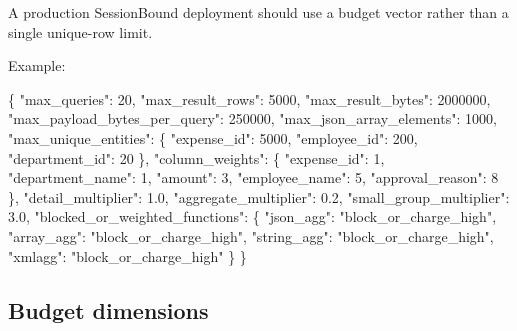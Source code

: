 \documentclass[journal]{IEEEtran}
\newenvironment{Shaded}{}{}
\newcommand{\DataTypeTok}[1]{\textcolor[rgb]{0.56,0.13,0.00}{#1}}
\newcommand{\DecValTok}[1]{\textcolor[rgb]{0.25,0.63,0.44}{#1}}
\newcommand{\FloatTok}[1]{\textcolor[rgb]{0.25,0.63,0.44}{#1}}
\newcommand{\FunctionTok}[1]{\textcolor[rgb]{0.02,0.16,0.49}{#1}}
\newcommand{\StringTok}[1]{\textcolor[rgb]{0.25,0.44,0.63}{#1}}
\begin{document}
A production SessionBound deployment should use a budget vector rather
than a single unique-row limit.

Example:

\begin{Shaded}
\begin{Highlighting}[]
\FunctionTok{\{}
  \DataTypeTok{"max\_queries"}\FunctionTok{:} \DecValTok{20}\FunctionTok{,}
  \DataTypeTok{"max\_result\_rows"}\FunctionTok{:} \DecValTok{5000}\FunctionTok{,}
  \DataTypeTok{"max\_result\_bytes"}\FunctionTok{:} \DecValTok{2000000}\FunctionTok{,}
  \DataTypeTok{"max\_payload\_bytes\_per\_query"}\FunctionTok{:} \DecValTok{250000}\FunctionTok{,}
  \DataTypeTok{"max\_json\_array\_elements"}\FunctionTok{:} \DecValTok{1000}\FunctionTok{,}
  \DataTypeTok{"max\_unique\_entities"}\FunctionTok{:} \FunctionTok{\{}
    \DataTypeTok{"expense\_id"}\FunctionTok{:} \DecValTok{5000}\FunctionTok{,}
    \DataTypeTok{"employee\_id"}\FunctionTok{:} \DecValTok{200}\FunctionTok{,}
    \DataTypeTok{"department\_id"}\FunctionTok{:} \DecValTok{20}
  \FunctionTok{\},}
  \DataTypeTok{"column\_weights"}\FunctionTok{:} \FunctionTok{\{}
    \DataTypeTok{"expense\_id"}\FunctionTok{:} \DecValTok{1}\FunctionTok{,}
    \DataTypeTok{"department\_name"}\FunctionTok{:} \DecValTok{1}\FunctionTok{,}
    \DataTypeTok{"amount"}\FunctionTok{:} \DecValTok{3}\FunctionTok{,}
    \DataTypeTok{"employee\_name"}\FunctionTok{:} \DecValTok{5}\FunctionTok{,}
    \DataTypeTok{"approval\_reason"}\FunctionTok{:} \DecValTok{8}
  \FunctionTok{\},}
  \DataTypeTok{"detail\_multiplier"}\FunctionTok{:} \FloatTok{1.0}\FunctionTok{,}
  \DataTypeTok{"aggregate\_multiplier"}\FunctionTok{:} \FloatTok{0.2}\FunctionTok{,}
  \DataTypeTok{"small\_group\_multiplier"}\FunctionTok{:} \FloatTok{3.0}\FunctionTok{,}
  \DataTypeTok{"blocked\_or\_weighted\_functions"}\FunctionTok{:} \FunctionTok{\{}
    \DataTypeTok{"json\_agg"}\FunctionTok{:} \StringTok{"block\_or\_charge\_high"}\FunctionTok{,}
    \DataTypeTok{"array\_agg"}\FunctionTok{:} \StringTok{"block\_or\_charge\_high"}\FunctionTok{,}
    \DataTypeTok{"string\_agg"}\FunctionTok{:} \StringTok{"block\_or\_charge\_high"}\FunctionTok{,}
    \DataTypeTok{"xmlagg"}\FunctionTok{:} \StringTok{"block\_or\_charge\_high"}
  \FunctionTok{\}}
\FunctionTok{\}}
\end{Highlighting}
\end{Shaded}

\hypertarget{budget-dimensions}{%
\subsection{Budget dimensions}\label{budget-dimensions}}
\end{document}
